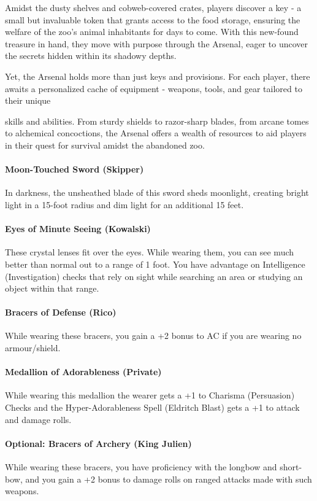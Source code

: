 Amidst the dusty shelves and cobweb-covered crates, players discover a key - a small but invaluable token that grants access to the food storage, ensuring the welfare of the zoo's animal inhabitants for days to come. With this new-found treasure in hand, they move with purpose through the Arsenal, eager to uncover the secrets hidden within its shadowy depths.

Yet, the Arsenal holds more than just keys and provisions. For each player, there awaits a personalized cache of equipment - weapons, tools, and gear tailored to their unique

skills and abilities. From sturdy shields to razor-sharp blades, from arcane tomes to alchemical concoctions, the Arsenal offers a wealth of resources to aid players in their quest for survival amidst the abandoned zoo.

\paragraph*{Moon-Touched Sword (Skipper)}
In darkness, the unsheathed blade of this sword sheds moonlight, creating bright light in a 15-foot radius and dim light for an additional 15 feet.

\paragraph*{Eyes of Minute Seeing (Kowalski)}
These crystal lenses fit over the eyes. While wearing them, you can see much better than normal out to a range of 1 foot. You have advantage on Intelligence (Investigation) checks that rely on sight while searching an area or studying an object within that range.

\paragraph*{Bracers of Defense (Rico)}
While wearing these bracers, you gain a +2 bonus to AC if you are wearing no armour/shield.

\paragraph*{Medallion of Adorableness (Private)}
While wearing this medallion the wearer gets a +1 to Charisma (Persuasion) Checks and the Hyper-Adorableness Spell (Eldritch Blast) gets a +1 to attack and damage rolls.

\paragraph*{Optional: Bracers of Archery (King Julien)}
While wearing these bracers, you have proficiency with the longbow and short-bow, and you gain a +2 bonus to damage rolls on ranged attacks made with such weapons.

